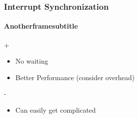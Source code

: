 \begin{frame}
    \frametitle{Interrupt Synchronization}
    \framesubtitle{Anotherframesubtitle}
	\begin{exampleblock}{+}
        \begin{itemize}
			\item No waiting
			\item Better Performance (consider overhead)         
    	\end{itemize}
   	\end{exampleblock}	
	\begin{alertblock}{-}    
    	\begin{itemize}
			\item Can easily get complicated
	     \end{itemize}
	\end{alertblock}
        
\end{frame}